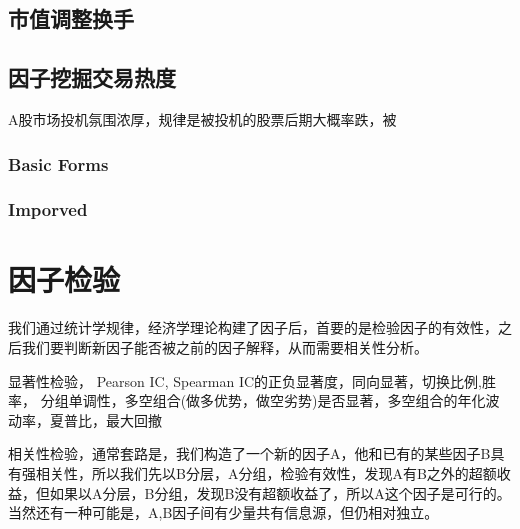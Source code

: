 \documentclass[12pt]{article}
\begin{document}
\subsection{市值调整换手}
\subsection{因子挖掘交易热度}
A股市场投机氛围浓厚，规律是被投机的股票后期大概率跌，被
\subsubsection{Basic Forms}
\subsubsection{Imporved}


\section{因子检验}
我们通过统计学规律，经济学理论构建了因子后，首要的是检验因子的有效性，之后我们要判断新因子能否被之前的因子解释，从而需要相关性分析。\par 
显著性检验，
Pearson IC, Spearman IC的正负显著度，同向显著，切换比例,胜率， 分组单调性，多空组合(做多优势，做空劣势)是否显著，多空组合的年化波动率，夏普比，最大回撤 \par
相关性检验，通常套路是，我们构造了一个新的因子A，他和已有的某些因子B具有强相关性，所以我们先以B分层，A分组，检验有效性，发现A有B之外的超额收益，但如果以A分层，B分组，发现B没有超额收益了，所以A这个因子是可行的。当然还有一种可能是，A,B因子间有少量共有信息源，但仍相对独立。
\end{document}
